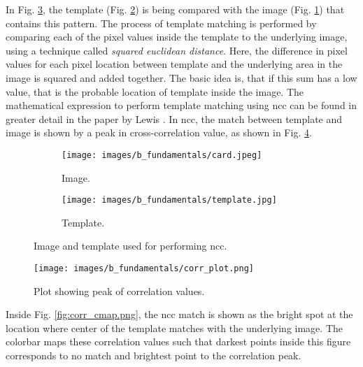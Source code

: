     \vspace{5mm}
    \noindent In Fig. \ref{fig:ncc_example}, the template (Fig. \ref{subfig:template.jpg}) is being compared with the image (Fig. \ref{subfig:card.jpg}) that contains this pattern. The process of template matching is performed by comparing each of the pixel values inside the template to the underlying image, using a technique called \emph{squared euclidean distance}. Here, the difference in pixel values for each pixel location between template and the underlying area in the image is squared and added together. The basic idea is, that if this sum has a low value, that is the probable location of template inside the image. The mathematical expression to perform template matching using \gls{ncc} can be found in greater detail in the paper by Lewis \cite{lewis}. In \gls{ncc}, the match between template and image is shown by a peak in cross-correlation value, as shown in Fig. \ref{fig:corr_plot.png}.

    \begin{figure}[h]
        \begin{subfigure}{0.5\textwidth}
            \centering
            \texttt{[image: images/b\_fundamentals/card.jpeg]}
            \caption{Image.}
            \label{subfig:card.jpg}
        \end{subfigure}
        \begin{subfigure}{0.5\textwidth}
            \centering
            \texttt{[image: images/b\_fundamentals/template.jpg]}
            \caption{Template.}
            \label{subfig:template.jpg}
        \end{subfigure}
        \caption{Image and template used for performing \gls{ncc}. \cite{img_card}}
        \label{fig:ncc_example}
    \end{figure}

    \begin{figure}[h]
        \centering
        \texttt{[image: images/b\_fundamentals/corr\_plot.png]}
        \caption{Plot showing peak of correlation values.}
        \label{fig:corr_plot.png}
    \end{figure}

    \clearpage
    
    \noindent Inside Fig. \ref{fig:corr_cmap.png}, the \gls{ncc} match is shown as the bright spot at the location where center of the template matches with the underlying image. The colorbar maps these correlation values such that darkest points inside this figure corresponds to no match and brightest point to the correlation peak.
    
